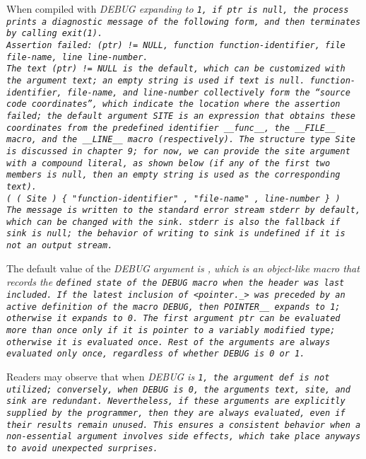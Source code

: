When compiled with \it{DEBUG} expanding to \tt{1}, if \it{ptr} is null,
the process prints a diagnostic message of the following form,
and then terminates by calling \tt{exit(1)}.\\

\tt{Assertion failed: (}\it{ptr}\tt{) != NULL, function}
\it{function-identifier}\tt{, file}
\it{file-name}\tt{, line}
\it{line-number}\tt{.}\\

The text \tt{(}\it{ptr}\tt{) != NULL} is the default,
which can be customized with the argument \it{text};
an empty string is used if \it{text} is null.
\it{function-identifier}, \it{file-name}, and \it{line-number}
collectively form the ``source code coordinates'',
which indicate the location where the assertion failed;
the default argument \tt{SITE} is an expression that obtains
these coordinates from the predefined identifier \tt{__func__},
the \tt{__FILE__} macro, and the \tt{__LINE__} macro (respectively).
The structure type \tt{Site} is discussed in chapter 9; for now,
we can provide the \it{site} argument with a compound literal, as shown below
(if any of the first two members is null,
then an empty string is used as the corresponding text).\\

\tt{( ( Site ) \{ "}\it{function-identifier}\tt{" , "}\it{file-name}\tt{" ,}
\it{line-number} \tt{\} )}\\

The message is written to the standard error stream \tt{stderr} by default,
which can be changed with the \it{sink}.
\tt{stderr} is also the fallback if \it{sink} is null; the behavior
of writing to \it{sink} is undefined if it is not an output stream.

The default value of the \it{DEBUG} argument is ,
which is an object-like macro that records the \tt{defined} state of
the \tt{DEBUG} macro when the header  was last included.
If the latest inclusion of \tt{<pointer._>} was preceded by an active
definition of the macro \tt{DEBUG}, then \tt{POINTER__} expands to \tt{1};
otherwise it expands to \tt{0}.
The first argument \it{ptr} can be evaluated more than once only if it
is pointer to a variably modified type; otherwise it is evaluated once.
Rest of the arguments are always evaluated only once,
regardless of whether \it{DEBUG} is \tt{0} or \tt{1}.

\note Readers may observe that when \it{DEBUG} is \tt{1},
the argument \it{def} is not utilized; conversely, when \it{DEBUG} is \tt{0},
the arguments \it{text}, \it{site}, and \it{sink} are redundant.
Nevertheless, if these arguments are explicitly supplied by the programmer,
then they are always evaluated, even if their results remain unused.
This ensures a consistent behavior when a non-essential argument involves
side effects, which take place anyways to avoid unexpected surprises.

